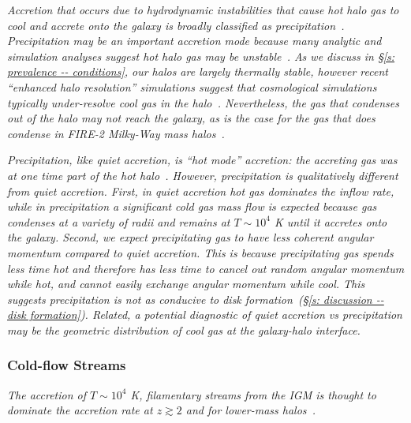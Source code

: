 \documentclass[fleqn,usenatbib]{mnras}
\begin{document}
\textit{
Accretion that occurs due to hydrodynamic instabilities that cause hot halo gas to cool and accrete onto the galaxy is broadly classified as precipitation~\citep[e.g.][]{Sharma2012, Voit2015a, Voit2018, Voit2021}.
Precipitation may be an important accretion mode because many analytic and simulation analyses suggest hot halo gas may be unstable~\citep[e.g.][]{Balbus1989, Maller2004, McCourt2012, McCourt2016, Joung2012a, Li2014, Armillotta2016, McNamara2016, Schneider2018, Liang2018a, Gronke2019, Gronke2019a, Li2019, Fielding2020}.
As we discuss in \S\ref{s: prevalence -- conditions}, our halos are largely thermally stable, however recent ``enhanced halo resolution'' simulations suggest that cosmological simulations typically under-resolve cool gas in the halo~\citep{VandeVoort2018, Peeples2019a, Hummels2019, Suresh2019}.
Nevertheless, the gas that condenses out of the halo may not reach the galaxy, as is the case for the gas that does condense in FIRE-2 Milky-Way mass halos~\citep{Esmerian2020}.
}

\textit{
Precipitation, like quiet accretion, is ``hot mode'' accretion: the accreting gas was at one time part of the hot halo~\citep[e.g.][]{Nelson2013}.
However, precipitation is qualitatively different from quiet accretion.
First, in quiet accretion hot gas dominates the inflow rate, while in precipitation a significant cold gas mass flow is expected because gas condenses at a variety of radii and remains at $T\sim 10^4$ K until it accretes onto the galaxy.
Second, we expect precipitating gas to have less coherent angular momentum compared to quiet accretion.
This is because precipitating gas spends less time hot and therefore has less time to cancel out random angular momentum while hot, and cannot easily exchange angular momentum while cool.
This suggests precipitation is not as conducive to disk formation~(\S\ref{s: discussion -- disk formation}).
Related, a potential diagnostic of quiet accretion vs precipitation may be the geometric distribution of cool gas at the galaxy-halo interface.
}

\subsubsection{Cold-flow Streams}

\textit{
The accretion of $T\sim 10^4$ K, filamentary streams from the IGM is thought to dominate the accretion rate at $z\gtrsim 2$ and for lower-mass halos~\citep[e.g.][]{Keres2005, Keres2009, Dekel2006, Oser2010, VanDeVoort2011a}.
}
\end{document}
